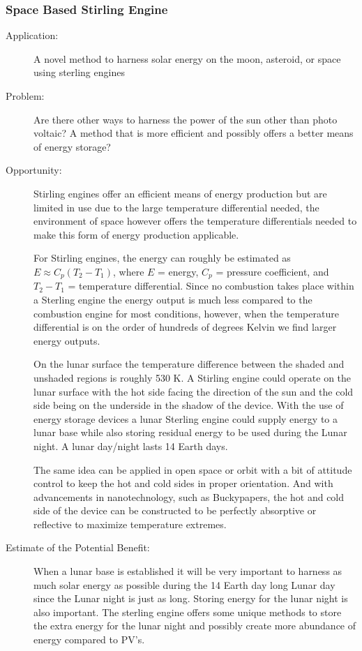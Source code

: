 \subsubsection{Space Based Stirling Engine}
\label{stirling}
\begin{description}   \item[Application:] A novel method to harness solar energy on the moon,   asteroid, or space using sterling engines
 
\item[Problem:] Are there other   ways to harness the power of the sun other than photo voltaic? A method   that is more efficient and possibly offers a better means of energy   storage?
 
\item[Opportunity:] Stirling   engines offer an efficient means of energy production but are limited  in  use due to the large temperature differential needed, the  environment  of space however offers the temperature differentials  needed to make  this form of energy production applicable. 
 
For Stirling engines, the energy   can roughly be estimated as $E \approx C_{p}(T_{2}-T_{1})$, where $E$ = energy, $C_p$ =  pressure  coefficient, and $T_2 - T_1$ = temperature differential. Since no   combustion takes place within a Sterling engine the energy output is   much less compared to the combustion engine for most conditions,   however, when the temperature differential is on the order of hundreds   of degrees Kelvin we find larger energy outputs. 
 
On the lunar surface the   temperature difference between the shaded and unshaded regions is   roughly 530 K. A Stirling engine could operate on the  lunar surface with  the hot side facing the direction of the sun and the  cold side being on  the underside in the shadow of the device. With the  use of energy  storage devices a lunar Sterling engine could supply  energy to a lunar  base while also storing residual energy to be used  during the Lunar  night. A lunar day/night lasts 14 Earth days.
 
The same idea can be applied in   open space or orbit with a bit of attitude control to keep the hot and   cold sides in proper orientation. And with advancements in  nanotechnology, such as  Buckypapers, the hot and cold side of the device  can be constructed to  be perfectly absorptive or reflective to maximize  temperature extremes.
 
\item[Estimate of the Potential   Benefit:] When a lunar base is established it will be very important to   harness as much solar energy as possible during the 14 Earth day long   Lunar day since the Lunar night is just as long. Storing energy for the   lunar night is also important. The sterling engine offers some unique   methods to store the extra energy for the lunar night and possibly   create more abundance of energy compared to \gls{PV}'s.
\end{description}
 

